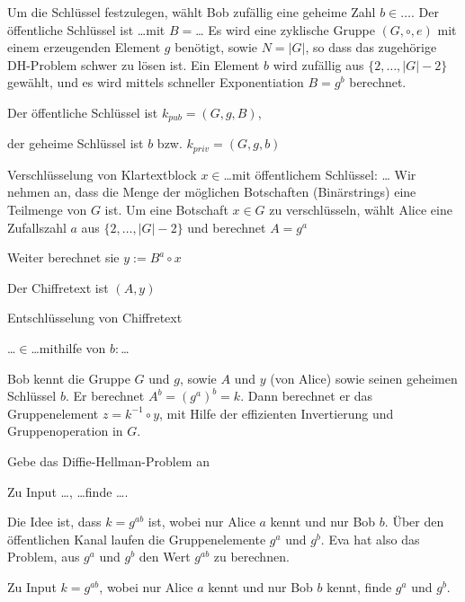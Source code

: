 \documentclass[avery5371, frame]{flashcards}
\begin{document}
\begin{flashcard}{Um die Schlüssel festzulegen, wählt Bob zufällig eine geheime Zahl $b\in\dots$. Der öffentliche Schlüssel ist \dots mit $B=$\dots}
    Es wird eine zyklische Gruppe $(G,\circ,e)$ mit einem erzeugenden Element $g$ benötigt, sowie $N=|G|$, so dass das zugehörige DH-Problem schwer zu lösen ist. Ein Element $b$ wird zufällig aus $\{2 ,\dots,|G|-2\}$ gewählt, und es wird mittels schneller Exponentiation $B=g^b$ berechnet.

    Der öffentliche Schlüssel ist $k_{pub}= (G,g,B)$,

    der geheime Schlüssel ist $b$ bzw. $k_{priv}=(G,g,b)$
\end{flashcard}

\begin{flashcard}{Verschlüsselung von Klartextblock $x\in$\dots mit öffentlichem Schlüssel: \dots}
    Wir nehmen an, dass die Menge der möglichen Botschaften (Binärstrings) eine Teilmenge von $G$ ist. Um eine Botschaft $x\in G$ zu verschlüsseln, wählt Alice eine Zufallszahl $a$ aus $\{2,\dots,|G|-2\}$ und berechnet $A=g^a$

    Weiter berechnet sie $y:=B^a \circ x$

    Der Chiffretext ist $(A,y)$
\end{flashcard}

\begin{flashcard}{Entschlüsselung von Chiffretext

        \dots$\in$\dots mithilfe von $b:$\dots}
    Bob kennt die Gruppe $G$ und $g$, sowie $A$ und $y$ (von Alice) sowie seinen geheimen Schlüssel $b$. Er berechnet $A^b= (g^a)^b=k$. Dann berechnet er das Gruppenelement $z=k^{-1}\circ y$, mit Hilfe der effizienten Invertierung und Gruppenoperation in $G$.
\end{flashcard}

\begin{flashcard}{Gebe das Diffie-Hellman-Problem an

        Zu Input \dots, \dots finde \dots .}
    Die Idee ist, dass $k=g^{ab}$ ist, wobei nur Alice $a$ kennt und nur Bob $b$.
    Über den öffentlichen Kanal laufen die Gruppenelemente $g^a$ und $g^b$.
    Eva hat also das Problem, aus $g^a$ und $g^b$ den Wert $g^{ab}$ zu berechnen.

    Zu Input $k=g^{ab}$, wobei nur Alice $a$ kennt und nur Bob $b$ kennt, finde $g^a$ und $g^b$.
\end{flashcard}
\end{document}
